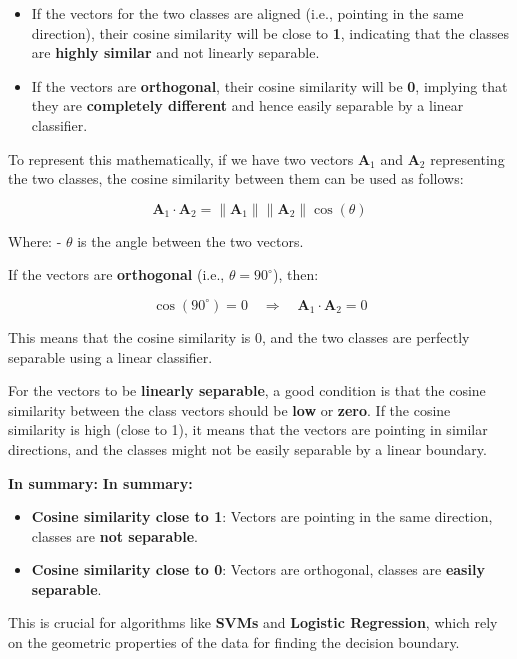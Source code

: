 \documentclass[
  12 pt,
  a4paper,
]{book}
\providecommand{\tightlist}{%
  \setlength{\itemsep}{0pt}\setlength{\parskip}{0pt}}
\numberwithin{equation}{section}
\theoremstyle{plain}      %
\theoremstyle{definition} %
\theoremstyle{remark}     %
\theoremstyle{note}         %
\begin{document}
\begin{itemize}
\item
  If the vectors for the two classes are aligned (i.e., pointing in the
  same direction), their cosine similarity will be close to \textbf{1},
  indicating that the classes are \textbf{highly similar} and not
  linearly separable.
\item
  If the vectors are \textbf{orthogonal}, their cosine similarity will
  be \textbf{0}, implying that they are \textbf{completely different}
  and hence easily separable by a linear classifier.
\end{itemize}

To represent this mathematically, if we have two vectors
\(\mathbf{A}_1\) and \(\mathbf{A}_2\) representing the two classes, the
cosine similarity between them can be used as follows:

\[
\mathbf{A}_1 \cdot \mathbf{A}_2 = \|\mathbf{A}_1\| \|\mathbf{A}_2\| \cos(\theta)
\]

Where: - \(\theta\) is the angle between the two vectors.

If the vectors are \textbf{orthogonal} (i.e., \(\theta = 90^\circ\)),
then:

\[
\cos(90^\circ) = 0 \quad \Rightarrow \quad \mathbf{A}_1 \cdot \mathbf{A}_2 = 0
\]

This means that the cosine similarity is 0, and the two classes are
perfectly separable using a linear classifier.

For the vectors to be \textbf{linearly separable}, a good condition is
that the cosine similarity between the class vectors should be
\textbf{low} or \textbf{zero}. If the cosine similarity is high (close
to 1), it means that the vectors are pointing in similar directions, and
the classes might not be easily separable by a linear boundary.

\textbf{In summary:} \textbf{In summary:}

\begin{itemize}
\tightlist
\item
  \textbf{Cosine similarity close to 1}: Vectors are pointing in the
  same direction, classes are \textbf{not separable}.
\item
  \textbf{Cosine similarity close to 0}: Vectors are orthogonal, classes
  are \textbf{easily separable}.
\end{itemize}

This is crucial for algorithms like \textbf{SVMs} and \textbf{Logistic
Regression}, which rely on the geometric properties of the data for
finding the decision boundary.
\end{document}
